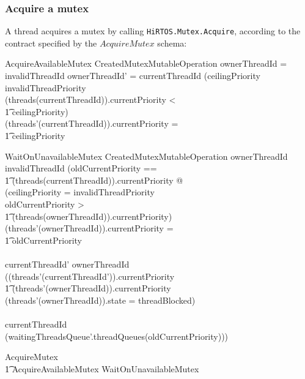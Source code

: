 \documentclass{AUJarticle}
\begin{document}
\subsubsection{Acquire a mutex}

A thread acquires a mutex by calling \verb`HiRTOS.Mutex.Acquire`, according to the contract
specified by the $AcquireMutex$ schema:

\begin{schema}{AcquireAvailableMutex}
   CreatedMutexMutableOperation
\where
   ownerThreadId = invalidThreadId
\also
   ownerThreadId' = currentThreadId
\also
(ceilingPriority \neq invalidThreadPriority \land \\
 (threads(currentThreadId)).currentPriority < \\
 \t1    ceilingPriority) \implies \\
 (threads'(currentThreadId)).currentPriority = \\
 \t1    ceilingPriority
\end{schema}

\begin{schema}{WaitOnUnavailableMutex}
   CreatedMutexMutableOperation
\where
   ownerThreadId \neq invalidThreadId
\also
(\LET oldCurrentPriority == \\
\t1 (threads(currentThreadId)).currentPriority @ \\
(ceilingPriority = invalidThreadPriority \land \\
 oldCurrentPriority > \\
 \t1 (threads(ownerThreadId)).currentPriority) \implies \\
 (threads'(ownerThreadId)).currentPriority = \\
 \t1 oldCurrentPriority \\
\land \\
 currentThreadId' \neq ownerThreadId \implies \\
 ((threads'(currentThreadId')).currentPriority \geq \\
 \t1 (threads'(ownerThreadId)).currentPriority \lor \\
 (threads'(ownerThreadId)).state = threadBlocked) \\
\land \\
   currentThreadId \in \\
\ran (waitingThreadsQueue'.threadQueues(oldCurrentPriority)))
\end{schema}

\begin{zed}
   AcquireMutex  \\
   \t1 AcquireAvailableMutex \lor WaitOnUnavailableMutex
\end{zed}
\end{document}
